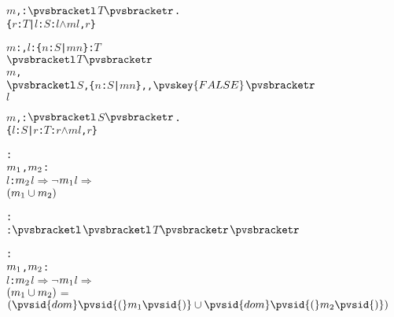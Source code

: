 \begin{alltt}
  \pvsid{(}\(m\), \pvsid{)}: \({\pvsbracketl}\)\(T\)\({\pvsbracketr}\). \pvskey{=}
      \{\(r\): \(T\) |  \pvsid{(}\(l\): \(S\)\pvsid{)}: \pvsid{(}\(l\)\pvsid{)} \(\wedge\) \(m\)\pvsid{(}\(l\), \(r\)\pvsid{)}\}\vspace*{\pvsdeclspacing}

  \pvsid{(}\(m\): , \(l\): \{\(n\): \(S\) | \pvsid{(}\(m\)\pvsid{)}\pvsid{(}\(n\)\pvsid{)}\}\pvsid{)}: \(T\) \pvskey{=}
      \({\pvsbracketl}\)\(T\)\({\pvsbracketr}\)
          \pvsid{(}\pvsid{(}\(m\),
                 \({\pvsbracketl}\)\(S\), \{\(n\): \(S\) | \pvsid{(}\(m\)\pvsid{)}\pvsid{(}\(n\)\pvsid{)}\}, , \({\pvskey{FALSE}}\)\({\pvsbracketr}\)
                     \pvsid{(}\pvsid{(}\(l\)\pvsid{)}\pvsid{)}\pvsid{)}\pvsid{)}\vspace*{\pvsdeclspacing}

  \pvsid{(}\(m\), \pvsid{)}: \({\pvsbracketl}\)\(S\)\({\pvsbracketr}\). \pvskey{=}
      \{\(l\): \(S\) |  \pvsid{(}\(r\): \(T\)\pvsid{)}: \pvsid{(}\(r\)\pvsid{)} \(\wedge\) \(m\)\pvsid{(}\(l\), \(r\)\pvsid{)}\}\vspace*{\pvsdeclspacing}

  : 
     \pvsid{(}\(m\sb{1}\), \(m\sb{2}\)\pvsid{)}:
      \pvsid{(} \(l\): \pvsid{(}\(m\sb{2}\)\pvsid{)}\pvsid{(}\(l\)\pvsid{)} \(\Rightarrow\) \(\neg\) \pvsid{(}\pvsid{(}\(m\sb{1}\)\pvsid{)}\pvsid{(}\(l\)\pvsid{)}\pvsid{)}\pvsid{)} \(\Rightarrow\)
       \pvsid{(}\(\setsotheruniontwofn{m\sb{1}}{m\sb{2}}\)\pvsid{)}\vspace*{\pvsdeclspacing}

  : 
     \pvsid{(}\pvsid{)}: \pvsid{(}\({\pvsbracketl}\)\({\pvsbracketl}\)\(T\)\({\pvsbracketr}\)\({\pvsbracketr}\)\pvsid{(}\pvsid{)}\pvsid{)}\vspace*{\pvsdeclspacing}

  : 
     \pvsid{(}\(m\sb{1}\), \(m\sb{2}\)\pvsid{)}:
      \pvsid{(} \(l\): \pvsid{(}\(m\sb{2}\)\pvsid{)}\pvsid{(}\(l\)\pvsid{)} \(\Rightarrow\) \(\neg\) \pvsid{(}\pvsid{(}\(m\sb{1}\)\pvsid{)}\pvsid{(}\(l\)\pvsid{)}\pvsid{)}\pvsid{)} \(\Rightarrow\)
       \pvsid{(}\(\setsotheruniontwofn{m\sb{1}}{m\sb{2}}\)\pvsid{)} \(=\) \(\setsotheruniontwofn{\pvsid{dom}\pvsid{(}m\sb{1}\pvsid{)}}{\pvsid{dom}\pvsid{(}m\sb{2}\pvsid{)}}\)\vspace*{\pvsdeclspacing}


\end{alltt}
